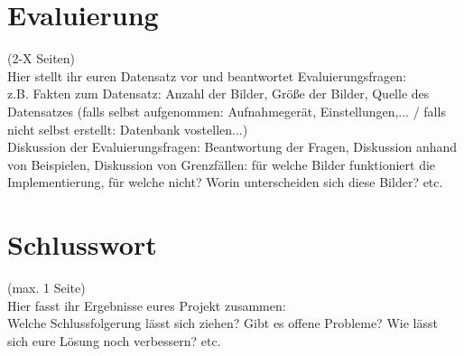 \documentclass[deutsch]{scrartcl}
\begin{document}
\newpage
\section{Evaluierung}
(2-X Seiten)\\
Hier stellt ihr euren Datensatz vor und beantwortet Evaluierungsfragen:\\
z.B. Fakten zum Datensatz: Anzahl der Bilder, Größe der Bilder, Quelle des Datensatzes (falls selbst aufgenommen: Aufnahmegerät, Einstellungen,... / falls nicht selbst erstellt: Datenbank vostellen...)\\
Diskussion der Evaluierungsfragen: Beantwortung der Fragen, Diskussion anhand von Beispielen, Diskussion von Grenzfällen: für welche Bilder funktioniert die Implementierung, für welche nicht? Worin unterscheiden sich diese Bilder? etc.

\newpage
\section{Schlusswort}
(max. 1 Seite)\\
Hier fasst ihr Ergebnisse eures Projekt zusammen:\\
Welche Schlussfolgerung lässt sich ziehen? Gibt es offene Probleme? Wie lässt sich eure Lösung noch verbessern? etc.

\newpage


\end{document}
